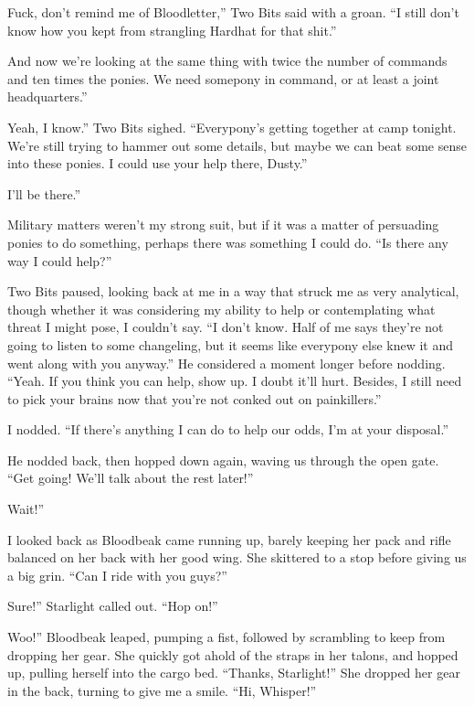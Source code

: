 \leavevmode{}Fuck, don’t remind me of Bloodletter,” Two Bits said with a groan. “I still don’t know how you kept from strangling Hardhat for that shit.”

\leavevmode{}And now we’re looking at the same thing with twice the number of commands and ten times the ponies. We need somepony in command, or at least a joint headquarters.”

\leavevmode{}Yeah, I know.” Two Bits sighed. “Everypony’s getting together at camp tonight. We’re still trying to hammer out some details, but maybe we can beat some sense into these ponies. I could use your help there, Dusty.”

\leavevmode{}I’ll be there.”

Military matters weren’t my strong suit, but if it was a matter of persuading ponies to do something, perhaps there was something I could do. “Is there any way I could help?”

Two Bits paused, looking back at me in a way that struck me as very analytical, though whether it was considering my ability to help or contemplating what threat I might pose, I couldn’t say. “I don’t know. Half of me says they’re not going to listen to some changeling, but it seems like everypony else knew it and went along with you anyway.” He considered a moment longer before nodding. “Yeah. If you think you can help, show up. I doubt it’ll hurt. Besides, I still need to pick your brains now that you’re not conked out on painkillers.”

I nodded. “If there’s anything I can do to help our odds, I’m at your disposal.”

He nodded back, then hopped down again, waving us through the open gate. “Get going! We’ll talk about the rest later!”

\leavevmode{}Wait!”

I looked back as Bloodbeak came running up, barely keeping her pack and rifle balanced on her back with her good wing. She skittered to a stop before giving us a big grin. “Can I ride with you guys?”

\leavevmode{}Sure!” Starlight called out. “Hop on!”

\leavevmode{}Woo!” Bloodbeak leaped, pumping a fist, followed by scrambling to keep from dropping her gear. She quickly got ahold of the straps in her talons, and hopped up, pulling herself into the cargo bed. “Thanks, Starlight!” She dropped her gear in the back, turning to give me a smile. “Hi, Whisper!”

